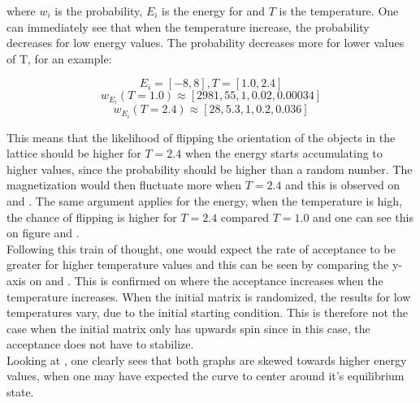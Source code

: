 \documentclass[10pt,a4paper]{article}
\begin{document}
\noindent where $w_i$ is the probability, $E_i$ is the energy for and $T$ is the temperature. One can immediately see that when the temperature increase, the probability decreases for low energy values. The probability decreases more for lower values of T, for an example:

$$
E_i = [-8,8] , T = [1.0,2.4]
$$
$$
w_{E_i}(T = 1.0) \approx [2981, 55, 1, 0.02, 0.00034]
$$
$$
w_{E_i}(T = 2.4) \approx [28, 5.3, 1, 0.2, 0.036]
$$

\noindent This means that the likelihood of flipping the orientation of the objects in the lattice should be higher for $T = 2.4$ when the energy starts accumulating to higher values, since the probability should be higher than a random number. The magnetization would then fluctuate more when $T = 2.4$ and this is observed on  and . The same argument applies for the energy, when the temperature is high, the chance of flipping is higher for $T = 2.4$ compared $T = 1.0$ and one can see this on figure  and .
\\
Following this train of thought, one would expect the rate of acceptance to be greater for higher temperature values and this can be seen by comparing the y-axis on  and . This is confirmed on  where the acceptance increases when the temperature increases. When the initial matrix is randomized, the results for low temperatures vary, due to the initial starting condition. This is therefore not the case when the initial matrix only has upwards spin since in this case, the acceptance does not have to stabilize.
\\
Looking at , one clearly sees that both graphs are skewed towards higher energy values, when one may have expected the curve to center around it's equilibrium state. 
\end{document}
